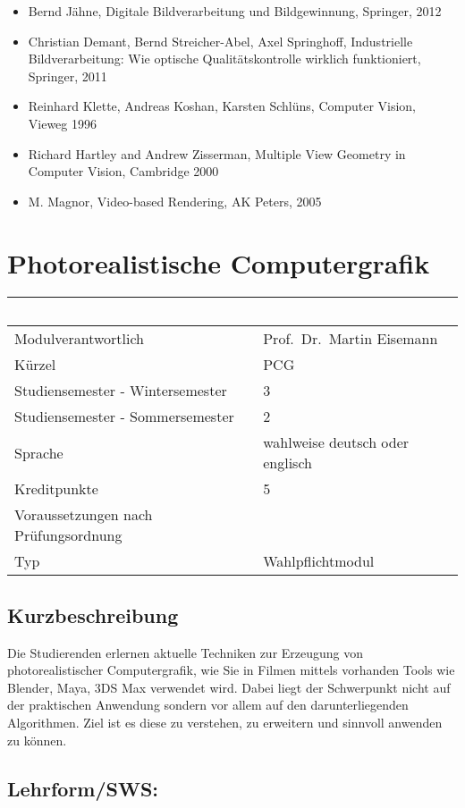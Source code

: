 \begin{itemize}
\item
  Bernd Jähne, Digitale Bildverarbeitung und Bildgewinnung, Springer,
  2012
\item
  Christian Demant, Bernd Streicher-Abel, Axel Springhoff, Industrielle
  Bildverarbeitung: Wie optische Qualitätskontrolle wirklich
  funktioniert, Springer, 2011
\item
  Reinhard Klette, Andreas Koshan, Karsten Schlüns, Computer Vision,
  Vieweg 1996
\item
  Richard Hartley and Andrew Zisserman, Multiple View Geometry in
  Computer Vision, Cambridge 2000
\item
  M. Magnor, Video-based Rendering, AK Peters, 2005
\end{itemize}

\chapter{Photorealistische
Computergrafik}\label{photorealistische-computergrafik}

\begin{longtable}[]{@{}ll@{}}
\toprule
~ & ~\tabularnewline
\midrule
\endhead
Modulverantwortlich & Prof.~Dr.~Martin Eisemann\tabularnewline
Kürzel & PCG\tabularnewline
Studiensemester - Wintersemester & 3\tabularnewline
Studiensemester - Sommersemester & 2\tabularnewline
Sprache & wahlweise deutsch oder englisch\tabularnewline
Kreditpunkte & 5\tabularnewline
Voraussetzungen nach Prüfungsordnung & ~\tabularnewline
Typ & Wahlpflichtmodul\tabularnewline
\bottomrule
\end{longtable}

\section*{Kurzbeschreibung}\label{kurzbeschreibung-7}

Die Studierenden erlernen aktuelle Techniken zur Erzeugung von
photorealistischer Computergrafik, wie Sie in Filmen mittels vorhanden
Tools wie Blender, Maya, 3DS Max verwendet wird. Dabei liegt der
Schwerpunkt nicht auf der praktischen Anwendung sondern vor allem auf
den darunterliegenden Algorithmen. Ziel ist es diese zu verstehen, zu
erweitern und sinnvoll anwenden zu können.

\section*{Lehrform/SWS:}\label{lehrformsws-16}

